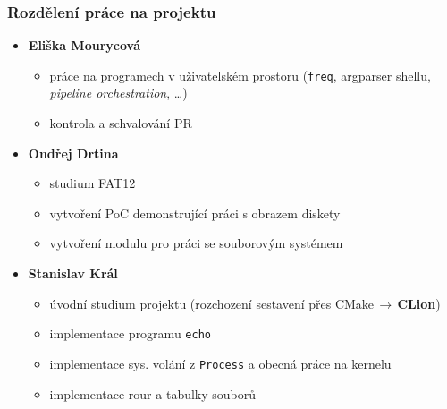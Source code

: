 \documentclass[xcolor=dvipsnames]{beamer}
\begin{document}
\begin{frame}
\frametitle{Rozdělení práce na projektu}
    \begingroup
    \small
	\begin{itemize}
        \setlength\itemsep{0.1em}
        \item \textbf{Eliška Mourycová}
        \begin{itemize}
            \setlength\itemsep{0.1em}
            \item práce na programech v uživatelském prostoru (\texttt{freq}, argparser shellu, \textit{pipeline orchestration}, \ldots)
            \item kontrola a schvalování PR
        \end{itemize}
        \item \textbf{Ondřej Drtina}
        \begin{itemize}
            \setlength\itemsep{0.1em}
            \item studium FAT12 
            \item vytvoření PoC demonstrující práci s obrazem diskety
            \item vytvoření modulu pro práci se souborovým systémem
        \end{itemize}
        \item \textbf{Stanislav Král}
        \begin{itemize}
            \setlength\itemsep{0.1em}
            \item úvodní studium projektu (rozchození sestavení přes CMake$\,\to\,$\textbf{CLion})
            \item implementace programu \texttt{echo}
            \item implementace sys. volání z \texttt{Process} a obecná práce na kernelu
            \item implementace rour a tabulky souborů
        \end{itemize}
  	\end{itemize}
    \endgroup
\end{frame}
\end{document}

